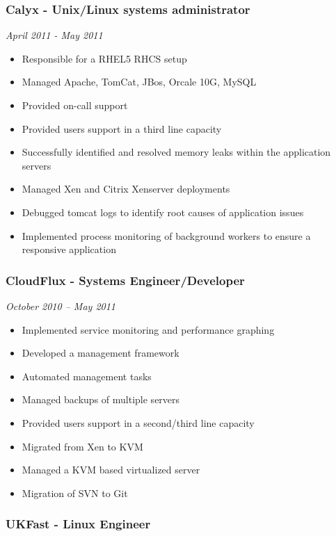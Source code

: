 \subsubsection{Calyx - Unix/Linux systems administrator}

\emph{April 2011 - May 2011}

\begin{itemize}
\item
  Responsible for a RHEL5 RHCS setup
\item
  Managed Apache, TomCat, JBos, Orcale 10G, MySQL
\item
  Provided on-call support
\item
  Provided users support in a third line capacity
\item
  Successfully identified and resolved memory leaks within the
  application servers
\item
  Managed Xen and Citrix Xenserver deployments
\item
  Debugged tomcat logs to identify root causes of application issues
\item
  Implemented process monitoring of background workers to ensure a
  responsive application
\end{itemize}

\subsubsection{CloudFlux - Systems Engineer/Developer}

\emph{October 2010 -- May 2011}

\begin{itemize}
\item
  Implemented service monitoring and performance graphing
\item
  Developed a management framework
\item
  Automated management tasks
\item
  Managed backups of multiple servers
\item
  Provided users support in a second/third line capacity
\item
  Migrated from Xen to KVM
\item
  Managed a KVM based virtualized server
\item
  Migration of SVN to Git
\end{itemize}

\subsubsection{UKFast - Linux Engineer}

